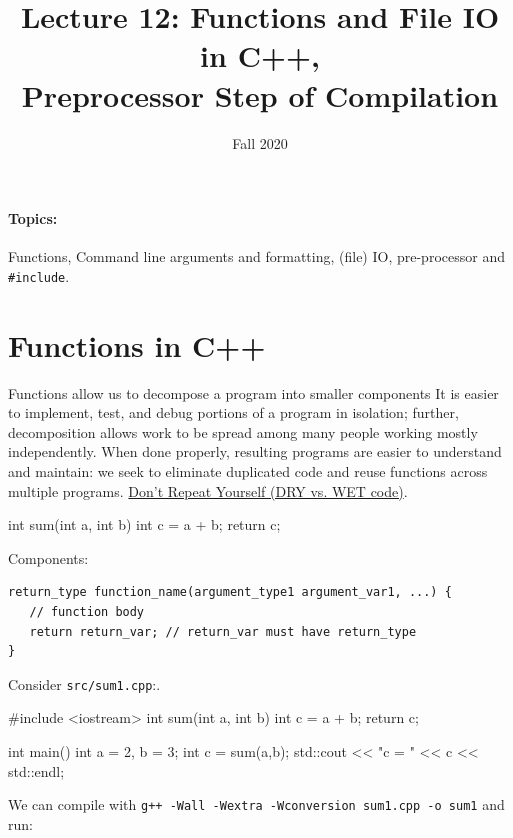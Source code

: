 \documentclass[12pt,letterpaper,twoside]{article}
\begin{document}
\title{Lecture 12: Functions and File IO in C++, \\ Preprocessor Step of Compilation\vspace{-5ex}}
\date{Fall 2020}
\maketitle

{\footnotesize
\paragraph{Topics:} Functions, Command line arguments and
formatting, (file) IO, pre-processor and \texttt{\#include}.
}
\vspace{-3ex}

\section{Functions in C++}
Functions allow us to decompose a program into smaller components
It is easier to implement, test, and debug portions of a program in isolation;
further, decomposition allows work to be spread among many people working mostly
independently. When done properly, resulting programs are easier to understand and
maintain: we seek to eliminate duplicated code and reuse functions across 
multiple programs. 
\href{https://en.wikipedia.org/wiki/Don%27t_repeat_yourself#DRY_vs_WET_solutions}
{Don't Repeat Yourself (DRY vs. WET code)}.


\begin{cpp}
int sum(int a, int b) {
  int c = a + b;
  return c;
}
\end{cpp}

Components:

{\footnotesize
\begin{verbatim}
return_type function_name(argument_type1 argument_var1, ...) {
   // function body
   return return_var; // return_var must have return_type
}
\end{verbatim}
}

Consider \texttt{src/sum1.cpp}:.
\begin{cpp}
#include <iostream>
int sum(int a, int b) {
  int c = a + b;
  return c;
}

int main() {
  int a = 2, b = 3;
  int c = sum(a,b);
  std::cout << "c = " << c << std::endl;
}
\end{cpp}

We can compile with \texttt{g++ -Wall -Wextra -Wconversion sum1.cpp -o sum1} and run:
\end{document}
